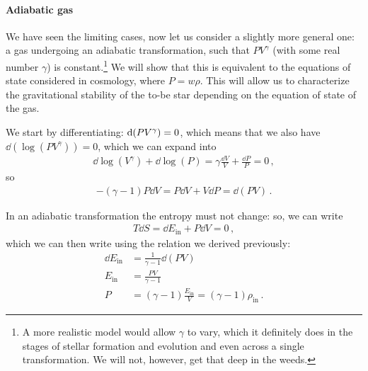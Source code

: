 \documentclass[main.tex]{subfiles}
\begin{document}


\paragraph{Adiabatic gas}

We have seen the limiting cases, now let us consider a slightly more general one: a gas undergoing an adiabatic transformation, such that \(P V^{\gamma }\) (with some real number \(\gamma \)) is constant.\footnote{A more realistic model would allow \(\gamma \) to vary, which it definitely does in the stages of stellar formation and evolution and even across a single transformation. We will not, however, get that deep in the weeds.}
We will show that this is equivalent to the equations of state considered in cosmology, where \(P = w \rho \). 
This will allow us to characterize the gravitational stability of the to-be star depending on the equation of state of the gas. 

We start by differentiating: \(\dd \qty(P V^{\gamma }) = 0\), which means that we also have \(\dd{ (\log (P V^{\gamma }))} = 0\), which we can expand into
%
\begin{align}
  \dd{\log (V^{\gamma })} + \dd{\log (P)} = 
  \gamma \frac{ \dd{V}}{V} + \frac{ \dd{P}}{P} = 0
\,,
\end{align}
%
so 
%
\begin{align}
  - (\gamma -1 ) P \dd{V}
  = P \dd{V} + V \dd{P} =
  \dd{(PV)} 
\,.
\end{align}
%

In an adiabatic transformation the entropy must not change: so, we can write
%
\begin{align}
  T \dd{S} = 
  \dd{E _{\text{in}}} + P \dd{V} = 0
\,,
\end{align}
%
which we can then write using the relation we derived previously:
%
\begin{align}
  \dd{E _{\text{in}}} &= \frac{1}{\gamma -1} \dd{(PV)} \\
  E _{\text{in}} &= \frac{PV}{\gamma -1}  \\
  P &= (\gamma - 1) \frac{E _{\text{in}}}{V} = (\gamma - 1) \rho _{\text{in}}
\,.
\end{align}
%
\end{document}

